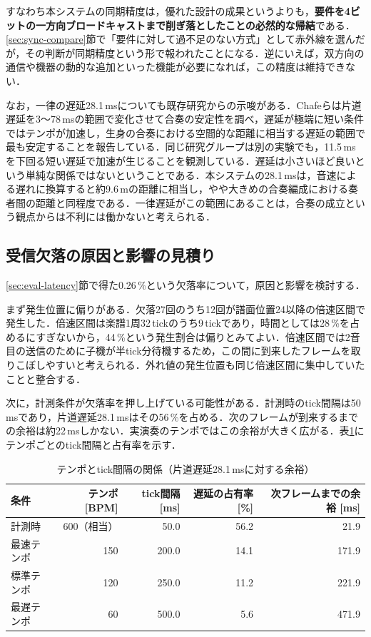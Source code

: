 \documentclass[uplatex,dvipdfmx]{jlreq}
\begin{document}
すなわち本システムの同期精度は，優れた設計の成果というよりも，\textbf{要件を4ビットの一方向ブロードキャストまで削ぎ落としたことの必然的な帰結}である．\ref{sec:sync-compare}節で「要件に対して過不足のない方式」として赤外線を選んだが，その判断が同期精度という形で報われたことになる．逆にいえば，双方向の通信や機器の動的な追加といった機能が必要になれば，この精度は維持できない．

なお，一律の遅延28.1\,msについても既存研究からの示唆がある．Chafeらは片道遅延を3〜78\,msの範囲で変化させて合奏の安定性を調べ，遅延が極端に短い条件ではテンポが加速し，生身の合奏における空間的な距離に相当する遅延の範囲で最も安定することを報告している\cite{chafe2010}．同じ研究グループは別の実験でも，11.5\,msを下回る短い遅延で加速が生じることを観測している\cite{chafe2004}．遅延は小さいほど良いという単純な関係ではないということである．本システムの28.1\,msは，音速による遅れに換算すると約9.6\,mの距離に相当し，やや大きめの合奏編成における奏者間の距離と同程度である．一律遅延がこの範囲にあることは，合奏の成立という観点からは不利には働かないと考えられる．

\subsection{受信欠落の原因と影響の見積り}
\label{sec:disc-loss}

\ref{sec:eval-latency}節で得た0.26\,\%という欠落率について，原因と影響を検討する．

まず発生位置に偏りがある．欠落27回のうち12回が譜面位置24以降の倍速区間で発生した．倍速区間は楽譜1周32\,tickのうち9\,tickであり，時間としては28\,\%を占めるにすぎないから，44\,\%という発生割合は偏りとみてよい．倍速区間では2音目の送信のために子機が半tick分待機するため，この間に到来したフレームを取りこぼしやすいと考えられる．外れ値の発生位置も同じ倍速区間に集中していたことと整合する．

次に，計測条件が欠落率を押し上げている可能性がある．計測時のtick間隔は50\,msであり，片道遅延28.1\,msはその56\,\%を占める．次のフレームが到来するまでの余裕は約22\,msしかない．実演奏のテンポではこの余裕が大きく広がる．表\ref{tab:duty}にテンポごとのtick間隔と占有率を示す．

\begin{table}[tb]
\caption{テンポとtick間隔の関係（片道遅延28.1\,msに対する余裕）}
\label{tab:duty}
\begin{center}
\small
\begin{tabular}{lrrrr}
\hline
条件 & テンポ [BPM] & tick間隔 [ms] & 遅延の占有率 [\%] & 次フレームまでの余裕 [ms] \\
\hline
計測時 & 600（相当） & 50.0 & 56.2 & 21.9 \\
最速テンポ & 150 & 200.0 & 14.1 & 171.9 \\
標準テンポ & 120 & 250.0 & 11.2 & 221.9 \\
最遅テンポ & 60 & 500.0 & 5.6 & 471.9 \\
\hline
\end{tabular}
\end{center}
\end{table}
\end{document}
